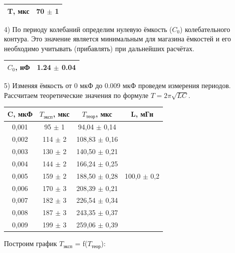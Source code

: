 \documentclass[a4paper,12pt]{article}
\begin{document}
\begin{center}
\begin{tabular}{|c|c|}
	\hline
	T, мкс & 70 $\pm$ 1 \\
	\hline
\end{tabular}
\end{center}

\par 4) По периоду колебаний определим нулевую ёмкость ($C_0$) колебательного контура. Это значение является минимальным для магазина ёмкостей и его необходимо учитывать (прибавлять) при дальнейших расчётах. 

\begin{center}
\begin{tabular}{|c|c|}
	\hline
	$C_0$, нФ & 1.24 $\pm$ 0.04\\
	\hline
\end{tabular}
\end{center}

\par 5) Изменяя ёмкость от 0 мкФ до 0.009 мкФ проведем измерения периодов. Рассчитаем теоретические значения по формуле $T = 2\pi\sqrt{LC}$.

\begin{center}
\begin{tabular}{|c|c|c|c|}
	\hline
	C, мкФ & $T_{\text{эксп}}$, мкс & $T_{\text{теор}}$, мкс & L, мГн \\
	\hline 
	0,001 & 95 $\pm$ 1 & 94,04 $\pm$ 0,14 & \multirow{9}{*}{100,0 $\pm$ 0,2} \\
	\cline {1-3}  0,002 & 114 $\pm$ 2 & 108,83 $\pm$ 0,16 & \\
	\cline {1-3}  0,003 & 130 $\pm$ 2 & 140,50 $\pm$ 0,21 & \\
	\cline {1-3}  0,004 & 144 $\pm$ 2 & 166,24 $\pm$ 0,25 & \\
	\cline {1-3}  0,005 & 159 $\pm$ 2 & 188,50 $\pm$ 0,28 & \\
	\cline {1-3}  0,006 & 170 $\pm$ 3 & 208,39 $\pm$ 0,21 & \\
	\cline {1-3}  0,007 & 182 $\pm$ 3 & 226,54 $\pm$ 0,34 & \\
	\cline {1-3}  0,008 & 187 $\pm$ 3 & 243,35 $\pm$ 0,37 & \\
	\cline {1-3}  0,009 & 199 $\pm$ 3 & 259,06 $\pm$ 0,39 & \\
	\hline	
\end{tabular}
\end{center}

\par Построим график $T_{\text{эксп}}$ = f($T_{\text{теор}}$): 
\end{document}
